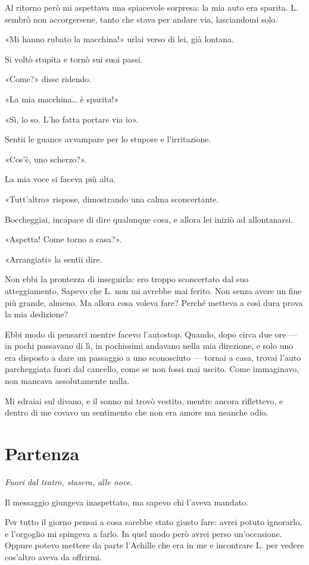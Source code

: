 \documentclass[a4paper,10pt]{memoir}
\begin{document}
Al ritorno però mi aspettava una spiacevole sorpresa: la mia auto era sparita. L. sembrò non accorgersene, tanto che
stava per andare via, lasciandomi solo.

«Mi hanno rubato la macchina!» urlai verso di lei, già lontana.

Si voltò stupita e tornò sui suoi passi.

«Come?» disse ridendo.

«La mia macchina\dots{} è sparita!»

«Sì, lo so. L'ho fatta portare via io».

Sentii le guance avvampare per lo stupore e l'irritazione.

«Cos'è, uno scherzo?».

La mia voce si faceva più alta.

«Tutt'altro» rispose, dimostrando una calma sconcertante.

Boccheggiai, incapace di dire qualunque cosa, e allora lei iniziò ad allontanarsi.

«Aspetta! Come torno a casa?».

«Arrangiati» la sentii dire.

Non ebbi la prontezza di inseguirla: ero troppo sconcertato dal suo atteggiamento. Sapevo che L. non mi avrebbe mai
ferito. Non senza avere un fine più grande, almeno. Ma allora cosa voleva fare? Perché metteva a così dura prova la mia
dedizione?

Ebbi modo di pensarci mentre facevo l'autostop. Quando, dopo circa due ore --- in pochi passavano di lì, in pochissimi
andavano nella mia direzione, e solo uno era disposto a dare un passaggio a uno sconosciuto --- tornai a casa, trovai
l'auto parcheggiata fuori dal cancello, come se non fossi mai uscito. Come immaginavo, non mancava assolutamente nulla.

Mi sdraiai sul divano, e il sonno mi trovò vestito, mentre ancora riflettevo, e dentro di me covavo un sentimento che
non era amore ma neanche odio.

\chapter{Partenza}

\emph{Fuori dal teatro, stasera, alle nove.}

Il messaggio giungeva inaspettato, ma sapevo chi l'aveva mandato.

Per tutto il giorno pensai a cosa sarebbe stato giusto fare: avrei potuto ignorarlo, e l'orgoglio mi spingeva a farlo.
In quel modo però avrei perso un'occasione. Oppure potevo mettere da parte l'Achille che era in me e incontrare L. per
vedere cos'altro aveva da offrirmi.
\end{document}
